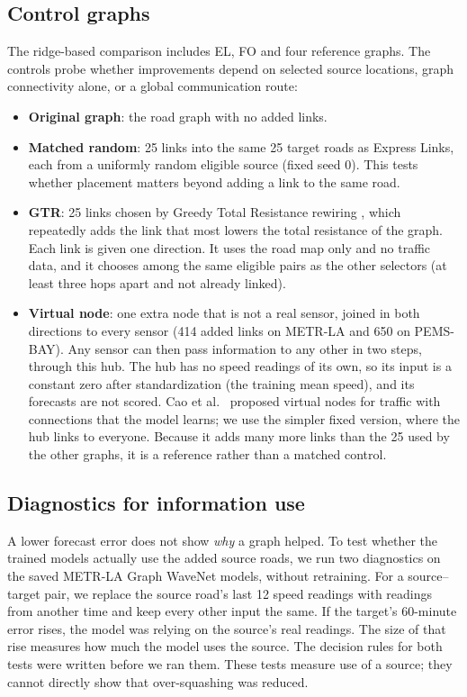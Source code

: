 \documentclass[journal]{IEEEtran}
\begin{document}
\subsection{Control graphs}
The ridge-based comparison includes EL, FO and four reference graphs. The controls probe whether improvements depend on selected source locations, graph connectivity alone, or a global communication route:
\begin{itemize}
\item \textbf{Original graph}: the road graph with no added links.
\item \textbf{Matched random}: 25 links into the same 25 target roads as Express Links, each from a uniformly random eligible source (fixed seed 0). This tests whether placement matters beyond adding a link to the same road.
\item \textbf{GTR}: 25 links chosen by Greedy Total Resistance rewiring \cite{black2023resistance}, which repeatedly adds the link that most lowers the total resistance of the graph. Each link is given one direction. It uses the road map only and no traffic data, and it chooses among the same eligible pairs as the other selectors (at least three hops apart and not already linked).
\item \textbf{Virtual node}: one extra node that is not a real sensor, joined in both directions to every sensor (414 added links on METR-LA and 650 on PEMS-BAY). Any sensor can then pass information to any other in two steps, through this hub. The hub has no speed readings of its own, so its input is a constant zero after standardization (the training mean speed), and its forecasts are not scored. Cao et al.\ \cite{cao2025virtual} proposed virtual nodes for traffic with connections that the model learns; we use the simpler fixed version, where the hub links to everyone. Because it adds many more links than the 25 used by the other graphs, it is a reference rather than a matched control.
\end{itemize}

\subsection{Diagnostics for information use}\label{sec:diag-method}
A lower forecast error does not show \emph{why} a graph helped. To test whether the trained models actually use the added source roads, we run two diagnostics on the saved METR-LA Graph WaveNet models, without retraining. For a source--target pair, we replace the source road's last 12 speed readings with readings from another time and keep every other input the same. If the target's 60-minute error rises, the model was relying on the source's real readings. The size of that rise measures how much the model uses the source. The decision rules for both tests were written before we ran them. These tests measure use of a source; they cannot directly show that over-squashing was reduced.
\end{document}
